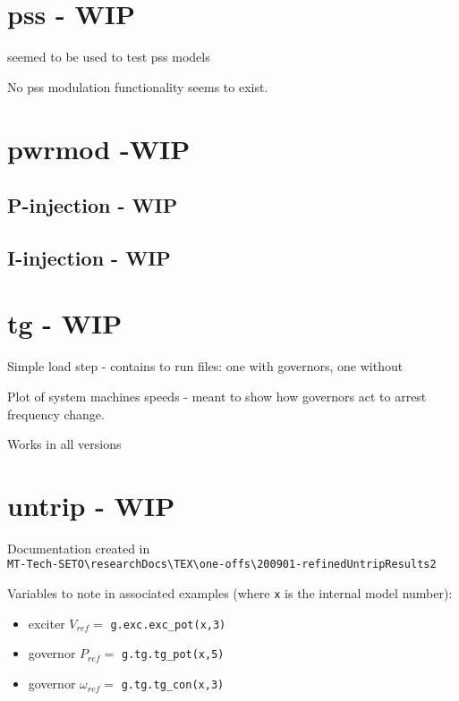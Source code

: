 \section{pss  - WIP}
seemed to be used to test pss models

No pss modulation functionality seems to exist.


\section{pwrmod -WIP} \label{sec: pwrmodExamples}
\subsection{P-injection - WIP}
\subsection{I-injection - WIP}


\section{tg - WIP}
Simple load step - contains to run files: one with governors, one without

Plot of system machines speeds - meant to show how governors act to arrest frequency change.

Works in all versions


\section{untrip - WIP}
Documentation created in\\ \verb|MT-Tech-SETO\researchDocs\TEX\one-offs\200901-refinedUntripResults2|

Variables to note in associated examples (where \verb|x| is the internal model number):
\begin{itemize}
\item exciter $V_{ref} = $ \verb|g.exc.exc_pot(x,3)|
\item governor $P_{ref} = $ \verb|g.tg.tg_pot(x,5)|
\item governor $\omega_{ref} = $ \verb|g.tg.tg_con(x,3)|
\end{itemize}